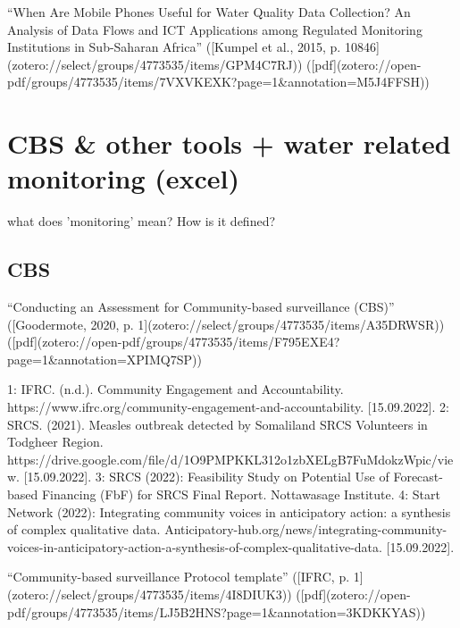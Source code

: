{“When Are Mobile Phones Useful for Water Quality Data Collection? An Analysis of Data Flows and ICT Applications among Regulated Monitoring Institutions in Sub-Saharan Africa” ([Kumpel et al., 2015, p. 10846](zotero://select/groups/4773535/items/GPM4C7RJ)) ([pdf](zotero://open-pdf/groups/4773535/items/7VXVKEXK?page=1&annotation=M5J4FFSH))



\section{CBS & other tools + water related monitoring (excel)}

what does 'monitoring' mean? How is it defined?

\subsection{CBS}

“Conducting an Assessment for Community-based surveillance (CBS)” ([Goodermote, 2020, p. 1](zotero://select/groups/4773535/items/A35DRWSR)) ([pdf](zotero://open-pdf/groups/4773535/items/F795EXE4?page=1&annotation=XPIMQ7SP))

1: IFRC. (n.d.). Community Engagement and Accountability. https://www.ifrc.org/community-engagement-and-accountability. [15.09.2022].
2: SRCS. (2021). Measles outbreak detected by Somaliland SRCS Volunteers in Todgheer Region. https://drive.google.com/file/d/1O9PMPKKL312o1zbXELgB7FuMdokzWpic/view. [15.09.2022].
3: SRCS (2022): Feasibility Study on Potential Use of Forecast-based Financing (FbF) for SRCS Final Report. Nottawasage Institute.
4: Start Network (2022): Integrating community voices in anticipatory action: a synthesis of complex qualitative data. Anticipatory-hub.org/news/integrating-community-voices-in-anticipatory-action-a-synthesis-of-complex-qualitative-data. [15.09.2022].

“Community-based surveillance Protocol template” ([IFRC, p. 1](zotero://select/groups/4773535/items/4I8DIUK3)) ([pdf](zotero://open-pdf/groups/4773535/items/LJ5B2HNS?page=1&annotation=3KDKKYAS))


}
